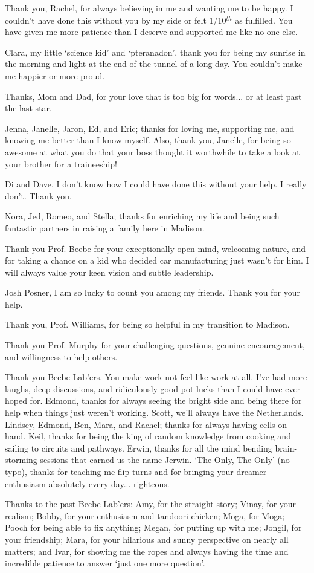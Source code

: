 Thank you, Rachel, for always believing in me and wanting me to be happy. I couldn't have done this without you by my side or felt 1/10$^{th}$ as fulfilled. You have given me more patience than I deserve and supported me like no one else.

Clara, my little `science kid' and `pteranadon', thank you for being my sunrise in the morning and light at the end of the tunnel of a long day. You couldn't make me happier or more proud.

Thanks, Mom and Dad, for your love that is too big for words... or at least past the last star.

Jenna, Janelle, Jaron, Ed, and Eric; thanks for loving me, supporting me, and knowing me better than I know myself. Also, thank you, Janelle, for being so awesome at what you do that your boss thought it worthwhile to take a look at your brother for a traineeship!

Di and Dave, I don't know how I could have done this without your help. I really don't. Thank you.

Nora, Jed, Romeo, and Stella; thanks for enriching my life and being such fantastic partners in raising a family here in Madison.

Thank you Prof. Beebe for your exceptionally open mind, welcoming nature, and for taking a chance on a kid who decided car manufacturing just wasn't for him. I will always value your keen vision and subtle leadership.

Josh Posner, I am so lucky to count you among my friends. Thank you for your help.

Thank you, Prof. Williams, for being so helpful in my transition to Madison.

Thank you Prof. Murphy for your challenging questions, genuine encouragement, and willingness to help others.

Thank you Beebe Lab'ers. You make work not feel like work at all. I've had more laughs, deep discussions, and ridiculously good pot-lucks than I could have ever hoped for. Edmond, thanks for always seeing the bright side and being there for help when things just weren't working. Scott, we'll always have the Netherlands. Lindsey, Edmond, Ben, Mara, and Rachel; thanks for always having cells on hand. Keil, thanks for being the king of random knowledge from cooking and sailing to circuits and pathways. Erwin, thanks for all the mind bending brain-storming sessions that earned us the name Jerwin. `The Only, The Only' (no typo), thanks for teaching me flip-turns and for bringing your dreamer-enthusiasm absolutely every day... righteous. 

Thanks to the past Beebe Lab'ers: Amy, for the straight story; Vinay, for your realism; Bobby, for your enthusiasm and tandoori chicken; Moga, for Moga; Pooch for being able to fix anything; Megan, for putting up with me; Jongil, for your friendship; Mara, for your hilarious and sunny perspective on nearly all matters; and Ivar, for showing me the ropes and always having the time and incredible patience to answer `just one more question'.



